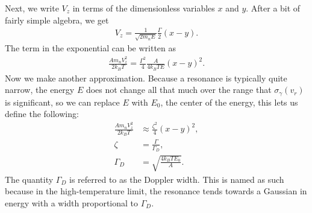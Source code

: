 Next, we write $V_z$ in terms of the dimensionless variables $x$ and $y$. After a bit of fairly simple algebra, we get
\begin{align}
  V_z = \frac{1}{\sqrt{2 m_n E} } \frac{\Gamma}{2} ( x - y ) .
\end{align}
The term in the exponential can be written as
\begin{align}
  \frac{ A m_n V_z^2 }{ 2 k_B T } = \frac{\Gamma^2}{4} \frac{A}{4 k_B T E} ( x - y )^2 .
\end{align}
Now we make another approximation. Because a resonance is typically quite narrow, the energy $E$ does not change all that much over the range that $\sigma_\gamma(v_r)$ is significant, so we can replace $E$ with $E_0$, the center of the energy, this lets us define the following:
\begin{subequations}
\begin{align}
  \frac{ A m_n V_z^2 }{ 2 k_B T } &\approx \frac{\zeta^2}{4} ( x - y )^2 , \\
  \zeta &= \frac{\Gamma}{\Gamma_D}, \label{Eq:nuclearData_DopplerBroadening_zeta} \\
  \Gamma_D &= \sqrt{ \frac{ 4 k_B T E_0 }{ A } }.
\end{align}
\end{subequations}
The quantity $\Gamma_D$ is referred to as the Doppler width. This is named as such because in the high-temperature limit, the resonance tends towards a Gaussian in energy with a width proportional to $\Gamma_D$. 

